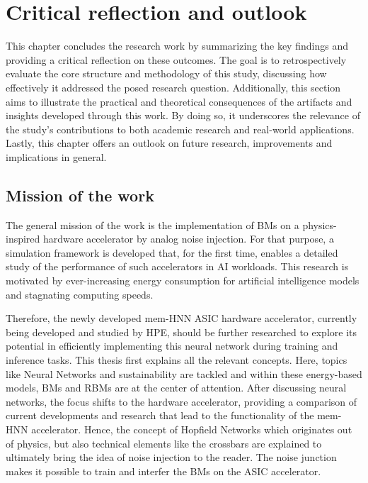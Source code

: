 \chapter{Critical reflection and outlook}
This chapter concludes the research work by summarizing the key findings and providing a critical reflection on these outcomes.
The goal is to retrospectively evaluate the core structure and methodology of this study, discussing how effectively it addressed the posed research question.
Additionally, this section aims to illustrate the practical and theoretical consequences of the artifacts and insights developed through this work.
By doing so, it underscores the relevance of the study’s contributions to both academic research and real-world applications.
Lastly, this chapter offers an outlook on future research, improvements and implications in general.

\section{Mission of the work}
The general mission of the work is the implementation of \ac{BM}s on a physics-inspired 
hardware accelerator by analog noise injection. 
For that purpose, a simulation framework is developed that, for the first time, enables a detailed study of the performance of such accelerators in AI workloads.
This research is motivated by ever-increasing energy consumption for artificial intelligence models and stagnating computing speeds.

Therefore, the newly developed \ac{mem-HNN} \ac{ASIC} hardware accelerator, currently being developed and studied by HPE,
should be further researched to explore its potential in efficiently implementing this neural network during training and inference tasks.
This thesis first explains all the relevant concepts.
Here, topics like Neural Networks and sustainability are tackled and within these energy-based models,
\ac{BM}s and \ac{RBM}s are at the center of attention. 
After discussing neural networks, the focus shifts to the hardware accelerator, providing a comparison of current developments and research that lead to the functionality of the \ac{mem-HNN} accelerator.
Hence, the concept of Hopfield Networks which originates out of physics, but also technical elements like the crossbars are explained to 
ultimately bring the idea of noise injection to the reader. 
The noise junction makes it possible to train and interfer the \ac{BM}s on the \ac{ASIC} accelerator.

